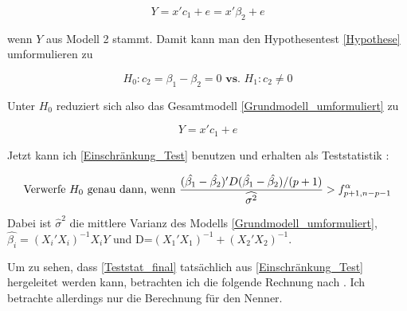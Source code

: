 \documentclass[12pt,a4paper]{article}
\theoremstyle{definition}
\theoremstyle{definition}
\theoremstyle{definition}
\begin{document}
\begin{equation*}
Y = x'c_1+e = x'\beta_2+e
\end{equation*}

wenn $Y$ aus Modell 2 stammt. Damit kann man den Hypothesentest \eqref{Hypothese} umformulieren zu

\begin{equation*}
H_{0} : c_2 = \beta_1-\beta_2 = 0  \textbf{ vs. }  H_{1} : c_2 \neq 0 
\end{equation*}

Unter $H_{0}$ reduziert sich also das Gesamtmodell \eqref{Grundmodell_umformuliert} zu 

\begin{equation*}
Y = x' c_1 + e
\end{equation*}

Jetzt kann ich \eqref{Einschränkung_Test} benutzen und erhalten als Teststatistik : 

\begin{equation}
\textnormal{Verwerfe } H_0 \textnormal{ genau dann, wenn } 
\frac{(\hat{\beta_1}-\hat{\beta_2})'D (\hat{\beta_1}-\hat{\beta_2})/(p+1)}{\widehat{\sigma^2}} > f^{\alpha}_{p+1,n-p-1}\label{Teststat_final}
\end{equation}

Dabei ist $\hat{\sigma}^2$ die mittlere Varianz des Modells \eqref{Grundmodell_umformuliert}, $\hat{\beta_i} = (X_i'X_i)^{-1}X_iY$ und \gls{D}=$(X_1'X_1)^{-1}+(X_2'X_2)^{-1}$. 

Um zu sehen, dass \eqref{Teststat_final} tatsächlich aus \eqref{Einschränkung_Test} hergeleitet werden kann, betrachten ich die folgende Rechnung nach \cite[115]{Liu64}. Ich betrachte allerdings nur die Berechnung für den Nenner.

%
%
%
\end{document}
